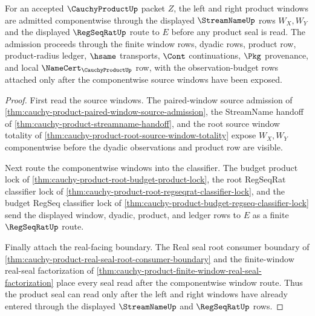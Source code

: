 \begin{theorem}
\label{thm:cauchy-product-componentwise-window-admission}
For an accepted $\CauchyProductUp$ packet $Z$, the left and right product windows are admitted componentwise through the displayed $\StreamNameUp$ rows $W_X,W_Y$ and the displayed $\RegSeqRatUp$ route to $E$ before any product seal is read. The admission proceeds through the finite window rows, dyadic rows, product row, product-radius ledger, $\hsame$ transports, $\Cont$ continuations, $\Pkg$ provenance, and local $\NameCert_{\CauchyProductUp}$ row, with the observation-budget rows attached only after the componentwise source windows have been exposed.
\end{theorem}
\begin{proof}
First read the source windows. The paired-window source admission of \autoref{thm:cauchy-product-paired-window-source-admission}, the StreamName handoff of \autoref{thm:cauchy-product-streamname-handoff}, and the root source window totality of \autoref{thm:cauchy-product-root-source-window-totality} expose $W_X,W_Y$ componentwise before the dyadic observations and product row are visible.

Next route the componentwise windows into the classifier. The budget product lock of \autoref{thm:cauchy-product-root-budget-product-lock}, the root RegSeqRat classifier lock of \autoref{thm:cauchy-product-root-regseqrat-classifier-lock}, and the budget RegSeq classifier lock of \autoref{thm:cauchy-product-budget-regseq-classifier-lock} send the displayed window, dyadic, product, and ledger rows to $E$ as a finite $\RegSeqRatUp$ route.

Finally attach the real-facing boundary. The Real seal root consumer boundary of \autoref{thm:cauchy-product-real-seal-root-consumer-boundary} and the finite-window real-seal factorization of \autoref{thm:cauchy-product-finite-window-real-seal-factorization} place every seal read after the componentwise window route. Thus the product seal can read only after the left and right windows have already entered through the displayed $\StreamNameUp$ and $\RegSeqRatUp$ rows.
\end{proof}

